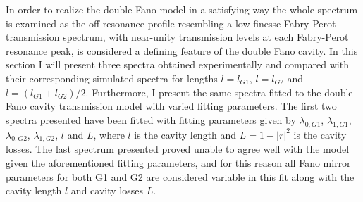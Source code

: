 In order to realize the double Fano model in a satisfying way the whole spectrum is examined as the off-resonance profile resembling a low-finesse Fabry-Perot transmission spectrum, with near-unity transmission levels at each Fabry-Perot resonance peak, is considered a defining feature of the double Fano cavity. In this section I will present three spectra obtained experimentally and compared with their corresponding simulated spectra for lengths $l=l_{G1}$, $l=l_{G2}$ and $l=(l_{G1} + l_{G2})/2$. Furthermore, I present the same spectra fitted to the double Fano cavity transmission model with varied fitting parameters. The first two spectra presented have been fitted with fitting parameters given by $\lambda_{0,G1}$, $\lambda_{1,G1}$, $\lambda_{0,G2}$, $\lambda_{1,G2}$, $l$ and $L$, where $l$ is the cavity length and $L = 1-|r|^2$ is the cavity losses. The last spectrum presented proved unable to agree well with the model given the aforementioned fitting parameters, and for this reason all Fano mirror parameters for both G1 and G2 are considered variable in this fit along with the cavity length $l$ and cavity losses $L$.

